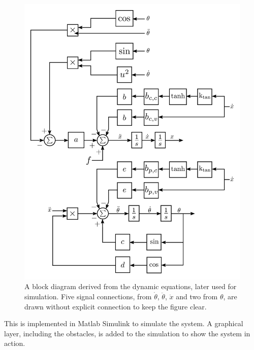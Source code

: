\begin{figure}[H]
  \includegraphics[width=.7\textwidth]{figures/blockDiagramWithFriction}
  \caption{A block diagram derived from the dynamic equations, later used for simulation. Five signal connections, from $\dot{\theta}$, $\ddot{\theta}$, $\ddot{x}$ and two from $\theta$, are drawn without explicit connection to keep the figure clear.}
  \label{fig:blockDiagram}
\end{figure}

This is implemented in Matlab Simulink to simulate the system. A graphical layer, including the obstacles, is added to the simulation to show the system in action.